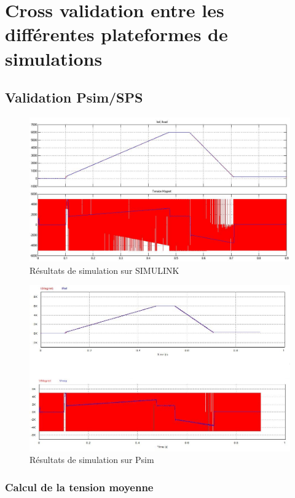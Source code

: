 \documentclass[11pt,letterpaper,final]{report}
\begin{document}
\chapter{Cross validation entre les différentes plateformes de simulations}
\section{Validation Psim/SPS}
\begin{figure}[ht]
\centering
\includegraphics[scale=0.5]{fig/resul_sim.jpg}
\caption{Résultats de simulation sur SIMULINK}
\end{figure}
\begin{figure}[ht]
\centering
\includegraphics[scale=0.6]{fig/resul_psim.jpg}
\caption{Résultats de simulation sur Psim}
\end{figure}
\subsection{Calcul de la tension moyenne}
\end{document}
